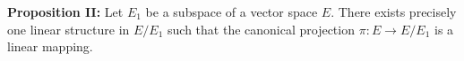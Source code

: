 \textbf{Proposition II:} Let $E_1$ be a subspace of a vector space $E$. There exists precisely one linear structure in $E/E_1$ such that the canonical projection $\pi: E \to E/E_1$ is a linear mapping.
